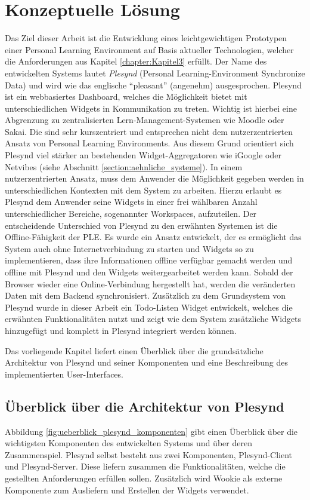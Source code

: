\chapter{Konzeptuelle Lösung} 
\label{chapter:Kapitel5}
Das Ziel dieser Arbeit ist die Entwicklung eines leichtgewichtigen Prototypen einer Personal Learning Environment auf Basis aktueller Technologien, welcher die Anforderungen aus Kapitel \ref{chapter:Kapitel3} erfüllt. Der Name des entwickelten Systems lautet \emph{Plesynd} (Personal Learning-Environment Synchronize Data) und wird wie das englische "`pleasant"' (angenehm) ausgesprochen. Plesynd ist ein webbasiertes Dashboard, welches die Möglichkeit bietet mit unterschiedlichen Widgets in Kommunikation zu treten. Wichtig ist hierbei eine Abgrenzung zu zentralisierten Lern-Management-Systemen wie Moodle oder Sakai. Die sind sehr kurszentriert und entsprechen nicht dem nutzerzentrierten Ansatz von Personal Learning Environments. Aus diesem Grund orientiert sich Plesynd viel stärker an bestehenden Widget-Aggregatoren wie iGoogle oder Netvibes (siehe Abschnitt \ref{section:aehnliche_systeme}). In einem nutzerzentrierten Ansatz, muss dem Anwender die Möglichkeit gegeben werden in unterschiedlichen Kontexten mit dem System zu arbeiten. Hierzu erlaubt es Plesynd dem Anwender seine Widgets in einer frei wählbaren Anzahl unterschiedlicher Bereiche, sogenannter Workspaces, aufzuteilen. Der entscheidende Unterschied von Plesynd zu den erwähnten Systemen ist die Offline-Fähigkeit der PLE. Es wurde ein Ansatz entwickelt, der es ermöglicht das System auch ohne Internetverbindung zu starten und Widgets so zu implementieren, dass ihre Informationen offline verfügbar gemacht werden und offline mit Plesynd und den Widgets weitergearbeitet werden kann. Sobald der Browser wieder eine Online-Verbindung hergestellt hat, werden die veränderten Daten mit dem Backend synchronisiert. Zusätzlich zu dem Grundsystem von Plesynd wurde in dieser Arbeit ein Todo-Listen Widget entwickelt, welches die erwähnten Funktionalitäten nutzt und zeigt wie dem System zusätzliche Widgets hinzugefügt und komplett in Plesynd integriert werden können.

Das vorliegende Kapitel liefert einen Überblick über die grundsätzliche Architektur von Plesynd und seiner Komponenten und eine Beschreibung des implementierten User-Interfaces.

\section{Überblick über die Architektur von Plesynd}\label{section:plesynd_architektur}
Abbildung \ref{fig:ueberblick_plesynd_komponenten} gibt einen Überblick über die wichtigsten Komponenten des entwickelten Systems und über deren Zusammenspiel. Plesynd selbst besteht aus zwei Komponenten, Plesynd-Client und Plesynd-Server. Diese liefern zusammen die Funktionalitäten, welche die gestellten Anforderungen erfüllen sollen. Zusätzlich wird Wookie als externe Komponente zum Ausliefern und Erstellen der Widgets verwendet.

